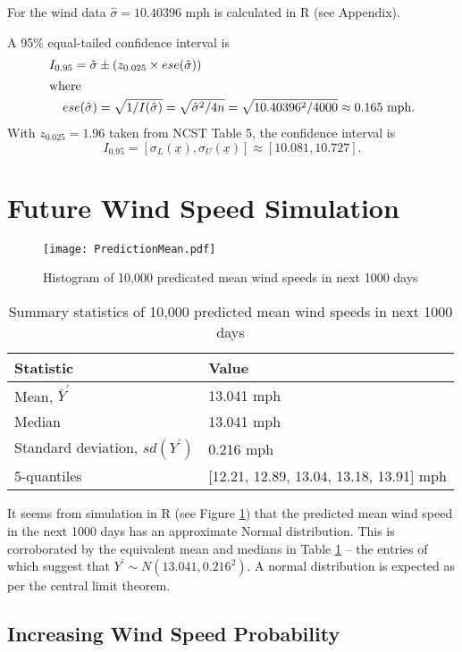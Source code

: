 \documentclass[11pt]{article}
\begin{document}
For the wind data $ \hat\sigma = 10.40396 \text{ mph}$ is calculated in R (see Appendix).

A 95\% equal-tailed confidence interval is
\begin{align*}
    I_{0.95} = \hat\sigma &\pm \left(z_{0.025} \times ese(\hat\sigma)\right) \\
\intertext{where}
    ese(\hat\sigma) &= \sqrt{1/I(\hat\sigma)} = \sqrt{\hat\sigma^2/4n} = \sqrt{10.40396^2 / 4000} \approx 0.165 \text{ mph.}
\end{align*}
With $z_{0.025} = 1.96$ taken from NCST Table 5, the confidence interval is
$$ I_{0.95} = [\sigma_L(\underline{x}), \sigma_U(\underline{x})] \approx [ 10.081 , 10.727 ] \text{.}$$

\section{Future Wind Speed Simulation}

\begin{figure}[ht]
    \centering
	\texttt{[image: PredictionMean.pdf]}
    \caption{Histogram of 10,000 predicated mean wind speeds in next 1000 days}
    \label{fig:mean_hist}
\end{figure}

\begin{table}[ht]
    \centering
    \begin{tabular}{ll}
    Statistic & Value \\ \hline
    Mean, $\bar Y^\prime$ \rule{0pt}{3ex} & 13.041 mph \\
    Median & 13.041 mph \\
    Standard deviation, $sd(Y^\prime)$ & 0.216 mph \\
    5-quantiles & [12.21, 12.89, 13.04, 13.18, 13.91] mph
    \end{tabular}
    \caption{Summary statistics of 10,000 predicted mean wind speeds in next 1000 days}
    \label{t:mean}
\end{table}

It seems from simulation in R (see Figure \ref{fig:mean_hist}) that the predicted mean
wind speed in the next 1000 days has an approximate Normal distribution.
This is corroborated by the equivalent mean and medians in Table
\ref{t:mean} -- the entries of which suggest that
$Y^\prime \sim N(13.041, 0.216^2)$. A normal distribution is expected as
per the central limit theorem.

\subsection{Increasing Wind Speed Probability}
\end{document}
